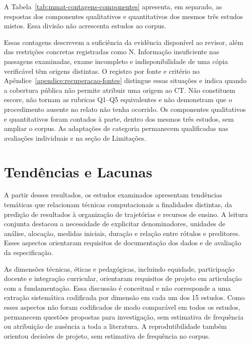 A Tabela~\ref{tab:mmat-contagens-componentes} apresenta, em separado, as respostas dos componentes qualitativos e quantitativos dos mesmos três estudos mistos. Essa divisão não acrescenta estudos ao corpus.



Essas contagens descrevem a suficiência da evidência disponível ao revisor, além das restrições concretas registradas como N. Informação insuficiente nas passagens examinadas, exame incompleto e indisponibilidade de uma cópia verificável têm origens distintas. O registro por fonte e critério no Apêndice~\ref{apendice:recuperacao-fontes} distingue essas situações e indica quando a cobertura pública não permite atribuir uma origem ao CT. Não constituem escore, não tornam as rubricas Q1--Q5 equivalentes e não demonstram que o procedimento ausente no relato não tenha ocorrido. Os componentes qualitativos e quantitativos foram contados à parte, dentro dos mesmos três estudos, sem ampliar o corpus. As adaptações de categoria permanecem qualificadas nas avaliações individuais e na seção de Limitações.

\section{Tendências e Lacunas}
\label{sec:tendencias-lacunas}

A partir desses resultados, os estudos examinados apresentam tendências temáticas que relacionam técnicas computacionais a finalidades distintas, da predição de resultados à organização de trajetórias e recursos de ensino. A leitura conjunta destacou a necessidade de explicitar denominadores, unidades de análise, alocação, medidas iniciais, duração e relação entre rótulos e preditores. Esses aspectos orientaram requisitos de documentação dos dados e de avaliação da especificação.

As dimensões técnicas, éticas e pedagógicas, incluindo equidade, participação docente e integração curricular, orientaram requisitos de projeto em articulação com a fundamentação. Essa discussão é conceitual e não corresponde a uma extração sistemática codificada por dimensão em cada um dos 15 estudos. Como esses aspectos não foram codificados de modo comparável em todos os estudos, permanecem questões propostas para investigação, sem estimativa de frequência ou atribuição de ausência a toda a literatura. A reprodutibilidade também orientou decisões de projeto, sem estimativa de frequência no corpus.

